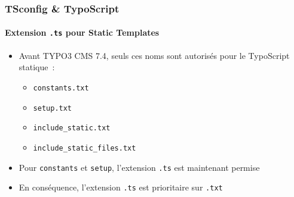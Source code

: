 
\begin{frame}[fragile]
	\frametitle{TSconfig \& TypoScript}
	\framesubtitle{Extension \texttt{.ts} pour Static Templates}

	\begin{itemize}

		\item Avant TYPO3 CMS 7.4, seuls ces noms sont autorisés pour le TypoScript statique~:

			\begin{itemize}
				\item \texttt{constants.txt}
				\item \texttt{setup.txt}
				\item \texttt{include\_static.txt}
				\item \texttt{include\_static\_files.txt}
			\end{itemize}

		\item Pour \texttt{constants} et \texttt{setup}, l'extension \texttt{.ts} est maintenant permise

		\item En conséquence, l'extension \texttt{.ts} est prioritaire sur \texttt{.txt}

	\end{itemize}

\end{frame}


